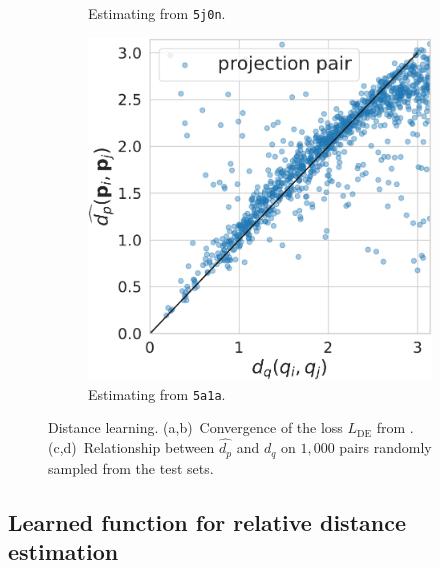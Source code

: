 \begin{figure}
\begin{minipage}[b]{0.45\linewidth}
\begin{subfigure}[b]{0.47\linewidth}
            \caption{Estimating from \texttt{5j0n}.}
        \end{subfigure}
        \hfill
        \begin{subfigure}[b]{0.47\linewidth}
            \centering
            \includegraphics[width=\linewidth]{figures/dPdQ_5a1a.pdf}
            \caption{Estimating from \texttt{5a1a}.}
        \end{subfigure}
        \caption{%
            Distance learning.
            (a,b)~Convergence of the loss $L_\text{DE}$ from .
            (c,d)~Relationship between $\widehat{d_p}$ and $d_q$ on $1,000$ pairs randomly sampled from the test sets.
        }\label{fig:losses-siamese}
    \end{minipage}
\end{figure}


\subsection{Learned function for relative distance estimation }\label{sec:results:distance-estimation:learned}


